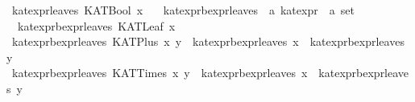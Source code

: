 \begin{isabellebody}
{}\ {}kat{}expr{}leaves\ {}KATBool\ x{}\ {}\ {}{}{}\isanewline
\isanewline
{}\isamarkupfalse%
\ kat{}expr{}bexpr{}leaves\ {}{}\ {}{}a\ kat{}expr\ {}\ {}a\ set{}\ \isanewline
\ \ {}kat{}expr{}bexpr{}leaves\ {}KATLeaf\ x{}\ {}\ {}{}{}\isanewline
{}\ {}kat{}expr{}bexpr{}leaves\ {}KATPlus\ x\ y{}\ {}\ kat{}expr{}bexpr{}leaves\ x\ {}\ kat{}expr{}bexpr{}leaves\ y{}\isanewline
{}\ {}kat{}expr{}bexpr{}leaves\ {}KATTimes\ x\ y{}\ {}\ kat{}expr{}bexpr{}leaves\ x\ {}\ kat{}expr{}bexpr{}leaves\ y{}\isanewline

\end{isabellebody}
